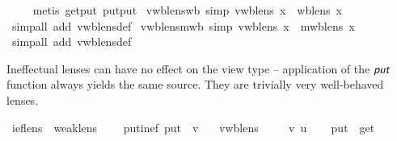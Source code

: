 \begin{isabellebody}
%
\isadelimproof
\ \ \ %
\endisadelimproof
%
\isatagproof
{}\isamarkupfalse%
\ {\isacharparenleft}metis\ get{\isacharunderscore}put\ put{\isacharunderscore}put{\isacharparenright}%
\endisatagproof
{\isafoldproof}%
%
\isadelimproof
\isanewline
%
\endisadelimproof
\isanewline
{}\isamarkupfalse%
\isanewline
\isanewline
{}\isamarkupfalse%
\ vwb{\isacharunderscore}lens{\isacharunderscore}wb\ {\isacharbrackleft}simp{\isacharbrackright}{\isacharcolon}\ {\isachardoublequoteopen}vwb{\isacharunderscore}lens\ x\ {\isasymLongrightarrow}\ wb{\isacharunderscore}lens\ x{\isachardoublequoteclose}\isanewline
%
\isadelimproof
\ \ %
\endisadelimproof
%
\isatagproof
{}\isamarkupfalse%
\ {\isacharparenleft}simp{\isacharunderscore}all\ add{\isacharcolon}\ vwb{\isacharunderscore}lens{\isacharunderscore}def{\isacharparenright}%
\endisatagproof
{\isafoldproof}%
%
\isadelimproof
\isanewline
%
\endisadelimproof
\isanewline
{}\isamarkupfalse%
\ vwb{\isacharunderscore}lens{\isacharunderscore}mwb\ {\isacharbrackleft}simp{\isacharbrackright}{\isacharcolon}\ {\isachardoublequoteopen}vwb{\isacharunderscore}lens\ x\ {\isasymLongrightarrow}\ mwb{\isacharunderscore}lens\ x{\isachardoublequoteclose}\isanewline
%
\isadelimproof
\ \ %
\endisadelimproof
%
\isatagproof
{}\isamarkupfalse%
\ {\isacharparenleft}simp{\isacharunderscore}all\ add{\isacharcolon}\ vwb{\isacharunderscore}lens{\isacharunderscore}def{\isacharparenright}%
\endisatagproof
{\isafoldproof}%
%
\isadelimproof
%
\endisadelimproof
%
\isamarkuptrue%
%
\begin{isamarkuptext}%
Ineffectual lenses can have no effect on the view type -- application of the $\textit{\textsf{put}}$ function
  always yields the same source. They are trivially very well-behaved lenses.%
\end{isamarkuptext}\isamarkuptrue%
\isamarkupfalse%
\ ief{\isacharunderscore}lens\ {\isacharequal}\ weak{\isacharunderscore}lens\ {\isacharplus}\isanewline
\ \ \ put{\isacharunderscore}inef{\isacharcolon}\ {\isachardoublequoteopen}put\ {\isasymsigma}\ v\ {\isacharequal}\ {\isasymsigma}{\isachardoublequoteclose}\isanewline
{}\isanewline
\isanewline
{}\isamarkupfalse%
\ vwb{\isacharunderscore}lens\isanewline
%
\isadelimproof
%
\endisadelimproof
%
\isatagproof
{}\isamarkupfalse%
\isanewline
\ \ \isamarkupfalse%
\ {\isasymsigma}\ v\ u\isanewline
\ \ \isamarkupfalse%
\ {\isachardoublequoteopen}put\ {\isasymsigma}\ {\isacharparenleft}get\ {\isasymsigma}{\isacharparenright}\ {\isacharequal}\ {\isasymsigma}{\isachardoublequoteclose}\isanewline

\end{isabellebody}
